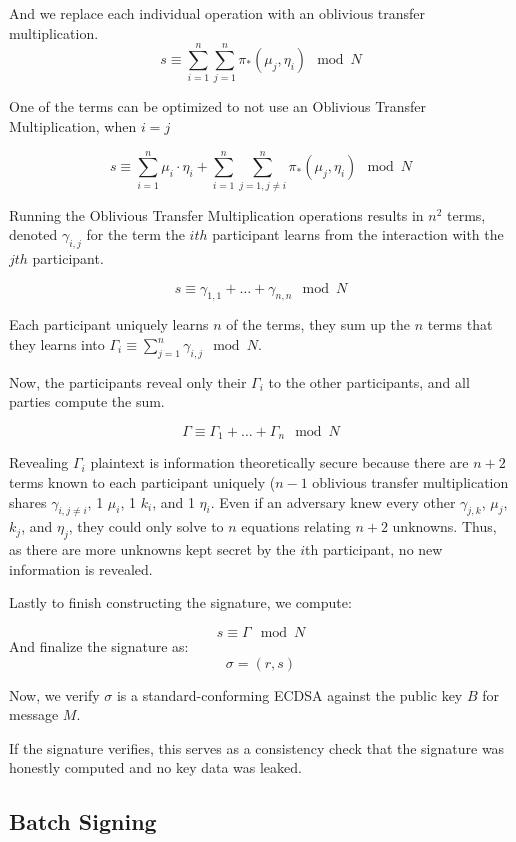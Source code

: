 \documentclass{article}
\newcommand{\mulOT}{\pi_{*}}
\begin{document}
And we replace each individual operation with an oblivious transfer multiplication.
$$s \equiv \sum_{i=1}^{n}\sum_{j=1}^n \mulOT(\mu_j, \eta_i) \mod N$$



One of the terms can be optimized to not use an Oblivious Transfer Multiplication, when $i=j$

$$s \equiv \sum_{i=1}^n \mu_i\cdot \eta_i +\sum_{i=1}^{n}\sum_{j=1, j \neq i}^n \mulOT(\mu_j, \eta_i) \mod N$$


Running the Oblivious Transfer Multiplication operations results in $n^2$ terms, denoted $\gamma_{i,j}$ for the term the $ith$ participant learns from the interaction with the $jth$ participant.

$$s \equiv \gamma_{1,1} + \ldots + \gamma_{n,n} \mod N$$

Each participant uniquely learns $n$ of the terms, they sum up the $n$ terms that they learns into $\Gamma_i \equiv \sum_{j=1}^n \gamma_{i,j} \mod N$.

Now, the participants reveal only their $\Gamma_i$ to the other participants, and all parties compute the sum.

$$\Gamma \equiv \Gamma_1 + \ldots + \Gamma_n \mod N$$

Revealing $\Gamma_i$ plaintext is information theoretically secure because there are $n+2$ terms known to each participant uniquely ($n-1$ oblivious transfer multiplication shares $\gamma_{i,j\neq i}$, 1 $\mu_i$, 1 $k_i$, and 1 $\eta_i$. Even if an adversary knew every other $\gamma_{j, k}$, $\mu_j$, $k_j$, and $\eta_j$, they could only solve to $n$ equations relating $n+2$ unknowns. Thus, as there are more unknowns kept secret by the $i$th participant, no new information is revealed.


Lastly to finish constructing the signature, we compute:

$$s \equiv \Gamma \mod N$$ 
And finalize the signature as:
$$\sigma = (r, s)$$



Now, we verify $\sigma$ is a standard-conforming ECDSA against the public key
$B$ for message $M$.

If the signature verifies, this serves as a consistency check that the signature was honestly computed and no key data was leaked.



\subsection{Batch Signing}
\end{document}
